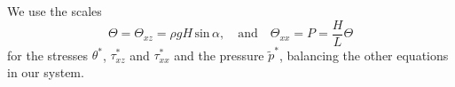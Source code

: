 We use the scales
%
\begin{equation*}
    \Theta = \Theta_{xz} = \rho g H \, \text{sin} \, \alpha, \quad \text{and} \quad \Theta_{xx} = P = \frac{H}{L} \Theta
\end{equation*}
%
for the stresses $\theta^*$, $\tau_{xz}^*$ and $\tau_{xx}^*$ and the pressure $\tilde{p}^*$, balancing the other equations in our system.
